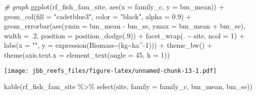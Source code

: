 \documentclass[
]{article}
\newenvironment{Shaded}{\begin{snugshade}}{\end{snugshade}}
\newcommand{\AttributeTok}[1]{\textcolor[rgb]{0.77,0.63,0.00}{#1}}
\newcommand{\CommentTok}[1]{\textcolor[rgb]{0.56,0.35,0.01}{\textit{#1}}}
\newcommand{\DecValTok}[1]{\textcolor[rgb]{0.00,0.00,0.81}{#1}}
\newcommand{\FloatTok}[1]{\textcolor[rgb]{0.00,0.00,0.81}{#1}}
\newcommand{\FunctionTok}[1]{\textcolor[rgb]{0.00,0.00,0.00}{#1}}
\newcommand{\NormalTok}[1]{#1}
\newcommand{\SpecialCharTok}[1]{\textcolor[rgb]{0.00,0.00,0.00}{#1}}
\newcommand{\StringTok}[1]{\textcolor[rgb]{0.31,0.60,0.02}{#1}}
\begin{document}
\begin{Shaded}
\begin{Highlighting}[]
\CommentTok{\# graph}
\FunctionTok{ggplot}\NormalTok{(rf\_fish\_fam\_site, }\FunctionTok{aes}\NormalTok{(}\AttributeTok{x =}\NormalTok{ family\_c, }\AttributeTok{y =}\NormalTok{ bm\_mean)) }\SpecialCharTok{+}
  \FunctionTok{geom\_col}\NormalTok{(}\AttributeTok{fill =} \StringTok{"cadetblue3"}\NormalTok{, }\AttributeTok{color =} \StringTok{"black"}\NormalTok{, }\AttributeTok{alpha =} \FloatTok{0.9}\NormalTok{) }\SpecialCharTok{+}
  \FunctionTok{geom\_errorbar}\NormalTok{(}\FunctionTok{aes}\NormalTok{(}\AttributeTok{ymin =}\NormalTok{ bm\_mean }\SpecialCharTok{{-}}\NormalTok{ bm\_se, }\AttributeTok{ymax =}\NormalTok{ bm\_mean }\SpecialCharTok{+}\NormalTok{ bm\_se), }\AttributeTok{width =}\NormalTok{ .}\DecValTok{2}\NormalTok{,}
                 \AttributeTok{position =} \FunctionTok{position\_dodge}\NormalTok{(.}\DecValTok{9}\NormalTok{)) }\SpecialCharTok{+}
  \FunctionTok{facet\_wrap}\NormalTok{(. }\SpecialCharTok{\textasciitilde{}}\NormalTok{ site, }\AttributeTok{ncol =} \DecValTok{1}\NormalTok{) }\SpecialCharTok{+}
  \FunctionTok{labs}\NormalTok{(}\AttributeTok{x =} \StringTok{""}\NormalTok{, }\AttributeTok{y =} \FunctionTok{expression}\NormalTok{(Biomass}\SpecialCharTok{\textasciitilde{}}\NormalTok{(kg}\SpecialCharTok{\textasciitilde{}}\NormalTok{ha}\SpecialCharTok{\^{}{-}}\DecValTok{1}\NormalTok{))) }\SpecialCharTok{+}
  \FunctionTok{theme\_bw}\NormalTok{() }\SpecialCharTok{+}
  \FunctionTok{theme}\NormalTok{(}\AttributeTok{axis.text.x =} \FunctionTok{element\_text}\NormalTok{(}\AttributeTok{angle =} \DecValTok{45}\NormalTok{, }\AttributeTok{h =} \DecValTok{1}\NormalTok{))}
\end{Highlighting}
\end{Shaded}

\texttt{[image: jbb\_reefs\_files/figure-latex/unnamed-chunk-13-1.pdf]}

\begin{Shaded}
\begin{Highlighting}[]
\FunctionTok{kable}\NormalTok{(rf\_fish\_fam\_site }\SpecialCharTok{\%\textgreater{}\%} \FunctionTok{select}\NormalTok{(site, }\AttributeTok{family =}\NormalTok{ family\_c, bm\_mean, bm\_se))}
\end{Highlighting}
\end{Shaded}
\end{document}
